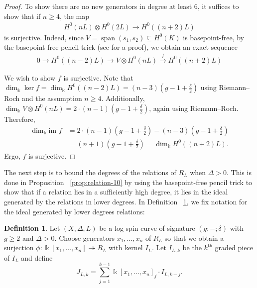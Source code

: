 \documentclass{amsart}
\theoremstyle{plain}
\theoremstyle{definition}
\newtheorem{defn}[thm]{Definition}
\theoremstyle{remark}
\numberwithin{equation}{section}
\newcommand\Bk{{\Bbbk}}
\newcommand\im{\text{im }}
\newcommand{\halfcan}{L}
\DeclareMathOperator{\newspan}{span}
\begin{document}
\begin{proof}
To show there are no new generators in degree at least $6$, it
suffices to show that if $n \geq 4$, the map
\begin{align*}
	H^0(nL) \otimes H^0(2L) \rightarrow H^0((n+2)L)
\end{align*}
is surjective. Indeed, since $V = \newspan(s_1, s_2) \subseteq
H^0(K)$ is basepoint-free, by the basepoint-free pencil trick (see
\cite[Lemma 2.6]{saint-donat:proj} for a proof), we obtain an exact
sequence
\begin{align*}
0 \longrightarrow H^0((n - 2)\halfcan) \longrightarrow V \otimes
H^0(n \halfcan) \overset{f}{\longrightarrow} H^0((n + 2)\halfcan)
\end{align*}

We wish to show $f$ is surjective.
Note that $\dim_\Bk \ker f = \dim_\Bk H^0((n - 2)L) = (n - 3)(g - 1+\frac{\delta}{2})$ using Riemann--Roch and the assumption $n \geq 4.$
Additionally, $\dim_\Bk V \otimes H^0(nL) = 2 \cdot (n - 1)(g - 1+\frac{\delta}{2})$, again using Riemann--Roch.
Therefore,
\begin{align*}
	\dim_\Bk \im f 	& = 2 \cdot (n - 1)(g - 1+ \frac{\delta}{2}) - (n - 3)(g - 1 + \frac{\delta}{2})\\
				& = (n + 1)(g - 1 + \frac{\delta}{2}) = \dim_\Bk H^0((n + 2)L).
\end{align*}
Ergo, $f$ is surjective.
\end{proof}

The next step is to bound the degrees of the relations of $R_\halfcan$ when $\Delta > 0$. This is done in Proposition ~\ref{prop:relation-10}
by using the basepoint-free pencil trick to show that if a relation lies in a sufficiently high degree, it lies in the ideal generated by the relations in lower degrees.  In Definition ~\ref{defn:lower-ideal}, we fix notation for the ideal generated by lower degrees relations:

\begin{defn}
\label{defn:lower-ideal}
Let $(X, \Delta, L)$ be a log spin curve of signature $(g; -; \delta
)$ with $g \geq 2$ and $\Delta > 0.$ Choose generators $x_1, \ldots
, x_n$ of $R_\halfcan$ so that we obtain a surjection $\phi: \Bk[x_1, \ldots
, x_n] \twoheadrightarrow R_\halfcan$ with kernel $I_\halfcan$. Let $I_{\halfcan, k}$ be
the $k^\text{th}$ graded piece of $I_\halfcan$ and define
\[
	J_{\halfcan,k} = \sum_{j = 1}^{k - 1}\Bk[x_1, \ldots, x_n]_j \cdot I_{\halfcan,k-j}.
\]
\end{defn}
\end{document}
